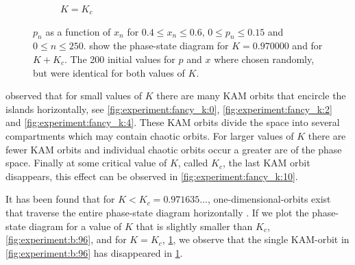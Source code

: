 \begin{figure}
\begin{subfigure}{\columnwidth}
		\caption{$K = K_c$}
		\label{fig:experiment:b:KC}
	\end{subfigure}	
	\caption{$p_n$ as a function of $x_n$ for $0.4 \leq x_n \leq 0.6$, $0 \leq p_n \leq 0.15$ and $0 \leq n \leq 250$.  show the phase-state diagram for $K = 0.970000$ and  for $K + K_c$. The 200 initial values for $p$ and $x$ where chosen randomly, but were identical for both values of $K$.}
	\label{fig:experiment:b:testKC}
\end{figure}

\citeauthor{greene1979method} observed that for small values of $K$ there are many KAM orbits that encircle the islands horizontally, see \cref{fig:experiment:fancy_k:0}, \ref{fig:experiment:fancy_k:2} and \ref{fig:experiment:fancy_k:4}. These KAM orbits divide the space into several compartments which may contain chaotic orbits. For larger values of $K$ there are fewer KAM orbits and individual chaotic orbits occur a greater are of the phase space. Finally at some critical value of $K$, called $K_c$, the last KAM orbit disappears, this effect can be observed in \cref{fig:experiment:fancy_k:10}. 

It has been found that for $K < K_c = 0.971635\dotsc$, one-dimensional-orbits exist that traverse the entire phase-state diagram horizontally \cite{kenzel1997physics}. If we plot the phase-state diagram for a value of $K$ that is slightly smaller than $K_c$, \cref{fig:experiment:b:96}, and for $K = K_c$, \cref{fig:experiment:b:KC}, we observe that the single KAM-orbit in \cref{fig:experiment:b:96} has disappeared in \cref{fig:experiment:b:KC}. 

